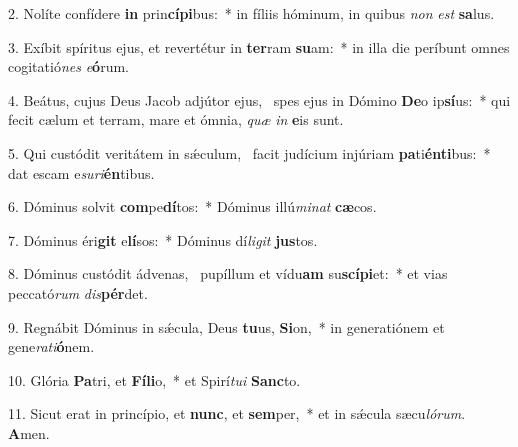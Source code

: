 2. Nolíte confídere \textbf{in} prin\textbf{cí}\textbf{pi}bus:~*  in fíliis hóminum, in quibus \textit{non} \textit{est} \textbf{sa}lus.\

3. Exíbit spíritus ejus, et revertétur in \textbf{ter}ram \textbf{su}am:~*  in illa die períbunt omnes cogitatió\textit{nes} \textit{e}\textbf{ó}rum.\

4. Beátus, cujus Deus Jacob adjútor ejus, \dag\  spes ejus in Dómino \textbf{De}o ip\textbf{sí}us:~*  qui fecit cælum et terram, mare et ómnia, \textit{quæ} \textit{in} \textbf{e}is sunt.\

5. Qui custódit veritátem in sǽculum, \dag\  facit judícium injúriam \textbf{pa}ti\textbf{én}\textbf{ti}bus:~*  dat escam e\textit{su}\textit{ri}\textbf{én}tibus.\

6. Dóminus solvit \textbf{com}pe\textbf{dí}tos:~*  Dóminus illú\textit{mi}\textit{nat} \textbf{cæ}cos.\

7. Dóminus éri\textbf{git} e\textbf{lí}sos:~*  Dóminus dí\textit{li}\textit{git} \textbf{jus}tos.\

8. Dóminus custódit ádvenas, \dag\  pupíllum et vídu\textbf{am} su\textbf{scí}\textbf{pi}et:~*  et vias peccató\textit{rum} \textit{dis}\textbf{pér}det.\

9. Regnábit Dóminus in sǽcula, Deus \textbf{tu}us, \textbf{Si}on,~*  in generatiónem et gene\textit{ra}\textit{ti}\textbf{ó}nem.\

10. Glória \textbf{Pa}tri, et \textbf{Fí}\textbf{li}o,~*  et Spirí\textit{tu}\textit{i} \textbf{Sanc}to.\

11. Sicut erat in princípio, et \textbf{nunc}, et \textbf{sem}per,~*  et in sǽcula sæcu\textit{ló}\textit{rum}. \textbf{A}men.\

